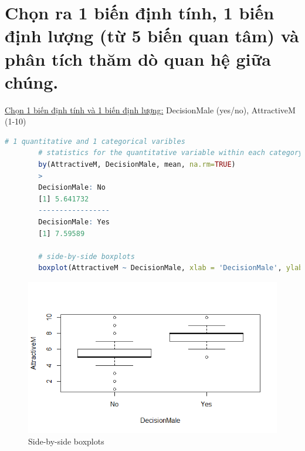 \documentclass[a4paper,12pt]{article}
\begin{document}
	\section{Chọn ra 1 biến định tính, 1 biến định lượng (từ 5 biến quan tâm) và phân tích thăm dò quan hệ giữa chúng.}
	\underline{Chọn 1 biến định tính và 1 biến định lượng:} DecisionMale (yes/no), AttractiveM (1-10)\\
	
	
	\begin{lstlisting}[language = R]
		# 1 quantitative and 1 categorical varibles
		# statistics for the quantitative variable within each category
		by(AttractiveM, DecisionMale, mean, na.rm=TRUE)
		>
		DecisionMale: No
		[1] 5.641732
		----------------- 
		DecisionMale: Yes
		[1] 7.59589
		
		# side-by-side boxplots
		boxplot(AttractiveM ~ DecisionMale, xlab = 'DecisionMale', ylab = 'AttractiveM')
	\end{lstlisting}
	
	\begin{figure}[H]
		\centering
		\includegraphics[width=0.8\linewidth]{Images/boxplot}
		\caption{Side-by-side boxplots}
		\label{fig:boxplot}
	\end{figure}
	
\end{document}
